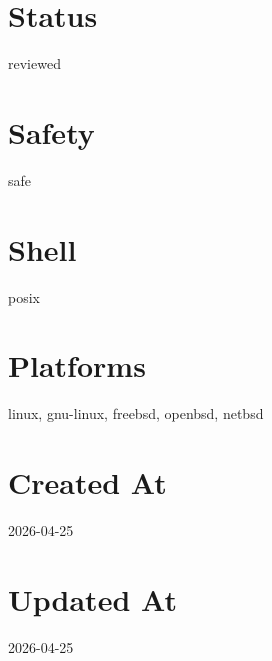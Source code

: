 \documentclass[openany]{book}
\begin{document}
\section*{Status}
reviewed

\section*{Safety}
safe

\section*{Shell}
posix

\section*{Platforms}
linux, gnu-linux, freebsd, openbsd, netbsd

\section*{Created At}
2026-04-25

\section*{Updated At}
2026-04-25
\end{document}
